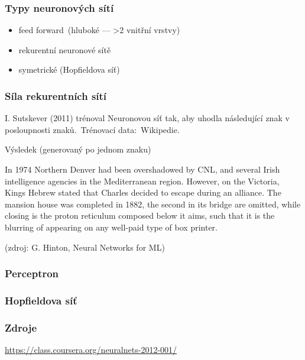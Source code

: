 \documentclass[red,professionalfont]{beamer}
\theoremstyle{definition}
\newcommand{\0}{\mbox{${\bf 0}$}}
\begin{document}
\begin{frame}\frametitle{Typy neuronových sítí}
 \begin{itemize}
  \item feed forward\pause\ (hluboké --- >2 vnitřní vrstvy)\pause
  \item rekurentní neuronové sítě\pause
  \item symetrické (Hopfieldova síť)
 \end{itemize}
\end{frame}

\begin{frame}\frametitle{Síla rekurentních sítí}
\begin{center}
 I. Sutskever (2011) trénoval Neuronovou síť tak, aby uhodla následující znak v posloupnosti znaků.\pause\
 Trénovací data:\pause\ Wikipedie.\pause
\end{center}
\alert{Výsledek (generovaný po jednom znaku)}\pause

In 1974 Northern Denver had been
overshadowed by CNL, and several Irish
intelligence agencies in the Mediterranean
region. However, on the Victoria, Kings
Hebrew stated that Charles decided to
escape during an alliance. The mansion
house was completed in 1882, the second in
its bridge are omitted, while closing is the
proton reticulum composed below it aims,
such that it is the blurring of appearing on any
well-paid type of box printer.
\begin{center} 
 {\tiny(zdroj: G. Hinton, Neural Networks for ML)}
\end{center}
\end{frame}

\begin{frame}\frametitle{Perceptron}

\end{frame}

\begin{frame}\frametitle{Hopfieldova síť}
\end{frame}




\begin{frame}\frametitle{Zdroje}
\url{https://class.coursera.org/neuralnets-2012-001/}
\end{frame}
\end{document}
